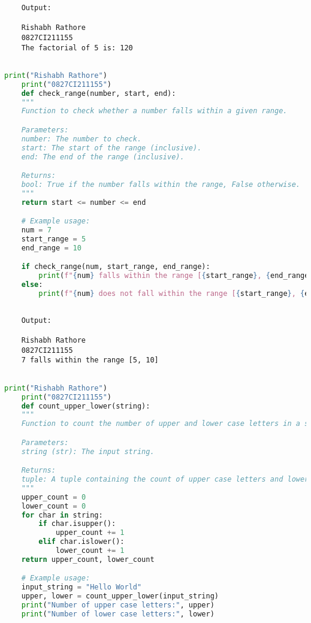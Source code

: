 \documentclass{report}
\begin{document}
\begin{verbatim}
	Output:

	Rishabh Rathore
	0827CI211155
	The factorial of 5 is: 120
	

\end{verbatim}


\newpage


\sol 
\begin{lstlisting}[language=Python]
	print("Rishabh Rathore")
	print("0827CI211155")
	def check_range(number, start, end):
    """
    Function to check whether a number falls within a given range.

    Parameters:
    number: The number to check.
    start: The start of the range (inclusive).
    end: The end of the range (inclusive).

    Returns:
    bool: True if the number falls within the range, False otherwise.
    """
    return start <= number <= end

	# Example usage:
	num = 7
	start_range = 5
	end_range = 10

	if check_range(num, start_range, end_range):
		print(f"{num} falls within the range [{start_range}, {end_range}]")
	else:
		print(f"{num} does not fall within the range [{start_range}, {end_range}]")
  

\end{lstlisting}

\begin{verbatim}
	Output:

	Rishabh Rathore
	0827CI211155
	7 falls within the range [5, 10]


\end{verbatim}


\newpage


\sol 
\begin{lstlisting}[language=Python]
	print("Rishabh Rathore")
	print("0827CI211155")
	def count_upper_lower(string):
    """
    Function to count the number of upper and lower case letters in a string.

    Parameters:
    string (str): The input string.

    Returns:
    tuple: A tuple containing the count of upper case letters and lower case letters, respectively.
    """
    upper_count = 0
    lower_count = 0
    for char in string:
        if char.isupper():
            upper_count += 1
        elif char.islower():
            lower_count += 1
    return upper_count, lower_count

	# Example usage:
	input_string = "Hello World"
	upper, lower = count_upper_lower(input_string)
	print("Number of upper case letters:", upper)
	print("Number of lower case letters:", lower)

\end{lstlisting}
\end{document}
